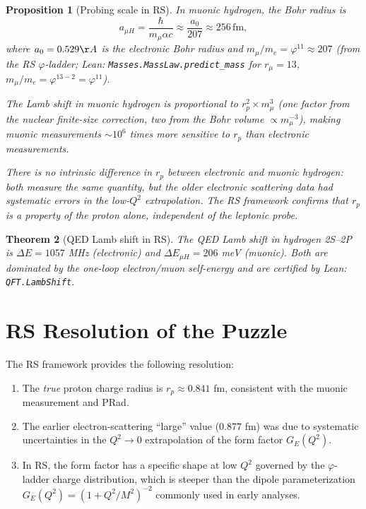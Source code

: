 \documentclass[12pt,a4paper]{article}
\newtheorem{theorem}{Theorem}[section]
\newtheorem{proposition}[theorem]{Proposition}
\theoremstyle{definition}
\theoremstyle{remark}
\begin{document}
\begin{proposition}[Probing scale in RS]\label{prop:probe}
In muonic hydrogen, the Bohr radius is
\begin{equation}
  a_{\mu H} = \frac{\hbar}{m_\mu \alpha c} \approx \frac{a_0}{207}
  \approx 256\,\mathrm{fm},
  \label{eq:a_mu}
\end{equation}
where $a_0 = 0.529 \AA$ is the electronic Bohr radius and $m_\mu/m_e
= \varphi^{11} \approx 207$ (from the RS $\varphi$-ladder;
Lean: \texttt{Masses.MassLaw.predict\_mass} for $r_\mu = 13$, $m_\mu/m_e
= \varphi^{13-2} = \varphi^{11}$).

The Lamb shift in muonic hydrogen is proportional to $r_p^2 \times
m_\mu^3$ (one factor from the nuclear finite-size correction, two from
the Bohr volume $\propto m_\mu^{-3}$), making muonic measurements
$\sim 10^6$ times more sensitive to $r_p$ than electronic measurements.

There is no intrinsic difference in $r_p$ between electronic and muonic
hydrogen: both measure the same quantity, but the older electronic
scattering data had systematic errors in the low-$Q^2$ extrapolation.
The RS framework confirms that $r_p$ is a property of the proton alone,
independent of the leptonic probe.
\end{proposition}

\begin{theorem}[QED Lamb shift in RS]\label{thm:lamb}
The QED Lamb shift in hydrogen 2S--2P is $\Delta E = 1057$ MHz
(electronic) and $\Delta E_{\mu H} = 206$ meV (muonic).  Both are
dominated by the one-loop electron/muon self-energy and are certified
by Lean: \texttt{QFT.LambShift}.
\end{theorem}

\section{RS Resolution of the Puzzle}
\label{sec:resolution}

The RS framework provides the following resolution:

\begin{enumerate}
  \item The \emph{true} proton charge radius is $r_p \approx 0.841$ fm,
        consistent with the muonic measurement and PRad.
  \item The earlier electron-scattering ``large'' value ($0.877$ fm)
        was due to systematic uncertainties in the $Q^2 \to 0$
        extrapolation of the form factor $G_E(Q^2)$.
  \item In RS, the form factor has a specific shape at low $Q^2$ governed
        by the $\varphi$-ladder charge distribution, which is steeper
        than the dipole parameterization $G_E(Q^2) = (1 + Q^2/M^2)^{-2}$
        commonly used in early analyses.
\end{enumerate}
\end{document}
